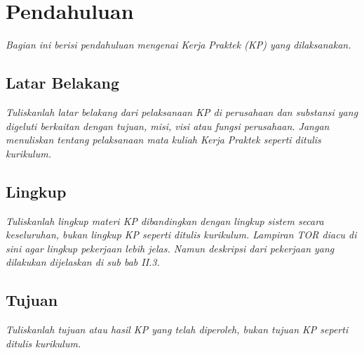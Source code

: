 \chapter{Pendahuluan}
\textit{Bagian ini berisi pendahuluan mengenai Kerja Praktek (KP) yang dilaksanakan.}

\section{Latar Belakang}
\textit{Tuliskanlah latar belakang dari pelaksanaan KP di perusahaan dan substansi yang digeluti berkaitan dengan tujuan, misi, visi atau fungsi perusahaan. Jangan menuliskan tentang pelaksanaan mata kuliah Kerja Praktek seperti ditulis kurikulum.}

\section{Lingkup}\label{lingkup-kerja}
\textit{Tuliskanlah lingkup materi KP dibandingkan dengan lingkup sistem secara keseluruhan, bukan lingkup KP seperti ditulis kurikulum. Lampiran TOR diacu di sini agar lingkup pekerjaan lebih jelas. Namun deskripsi dari pekerjaan yang dilakukan dijelaskan di sub bab II.3.}

\section{Tujuan}
\textit{Tuliskanlah tujuan atau hasil KP yang telah diperoleh, bukan tujuan KP seperti ditulis kurikulum.}